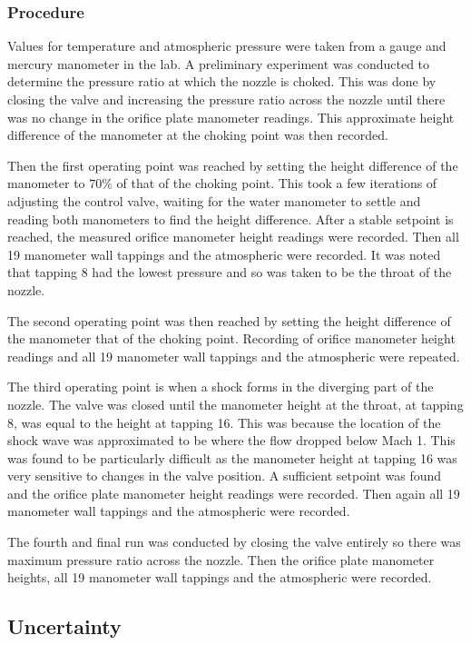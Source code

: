 \documentclass{article}
\begin{document}
\subsubsection{Procedure}

Values for temperature and atmospheric pressure were taken from a gauge and mercury manometer in the lab.
A preliminary experiment was conducted to determine the pressure ratio at which the nozzle is choked.
This was done by closing the valve and increasing the pressure ratio across the nozzle until there was no change in the orifice plate manometer readings.
This approximate height difference of the manometer at the choking point was then recorded.

Then the first operating point was reached by setting the height difference of the manometer to $70\%$ of that of the choking point.
This took a few iterations of adjusting the control valve, waiting for the water manometer to settle and reading both manometers to find the height difference.
After a stable setpoint is reached, the measured orifice manometer height readings were recorded. 
Then all 19 manometer wall tappings and the atmospheric were recorded.
It was noted that tapping 8 had the lowest pressure and so was taken to be the throat of the nozzle.

The second operating point was then reached by setting the height difference of the manometer that of the choking point.
Recording of orifice manometer height readings and all 19 manometer wall tappings and the atmospheric were repeated.

The third operating point is when a shock forms in the diverging part of the nozzle. The valve was closed until the manometer height at the throat, at tapping 8, was equal to the height at tapping 16.
This was because the location of the shock wave was approximated to be where the flow dropped below Mach 1.
This was found to be particularly difficult as the manometer height at tapping 16 was very sensitive to changes in the valve position.
A sufficient setpoint was found and the orifice plate manometer height readings were recorded.
Then again all 19 manometer wall tappings and the atmospheric were recorded.

The fourth and final run was conducted by closing the valve entirely so there was maximum pressure ratio across the nozzle.
Then the orifice plate manometer heights, all 19 manometer wall tappings and the atmospheric were recorded.

\subsection{Uncertainty}
\end{document}
